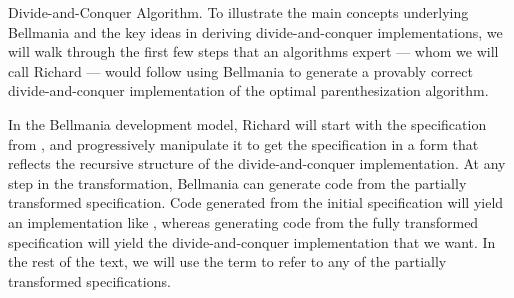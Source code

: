 \newcommand\qbox[1]{\fbox{\rm\scriptsize#1}}
\newcommand\tinyqbox[1]{\hspace{.5pt}\tikz \node[draw,inner sep=1.5pt] {$\scriptscriptstyle #1$};}

\newcommand\plusoneocd{\raisebox{.5pt}{$\scriptstyle+1$}}


\begin{paragraph}{Divide-and-Conquer Algorithm.}
To illustrate the main concepts underlying Bellmania and the key ideas in deriving divide-and-conquer implementations, 
we will walk through the first
few steps that an algorithms expert --- whom we will call Richard --- would follow using Bellmania to generate a provably correct divide-and-conquer implementation of the optimal parenthesization algorithm.

In the Bellmania development model, Richard will start with the specification from , and progressively manipulate it to get the specification in a form that reflects the recursive structure of the divide-and-conquer implementation. At any step in the transformation, Bellmania can generate code from the partially transformed specification. Code generated from the initial specification will yield an implementation like , whereas generating code from the fully transformed specification will yield the divide-and-conquer implementation that we want.
In the rest of the text, we will use the term  to refer to any of the partially transformed specifications.





\end{paragraph}
